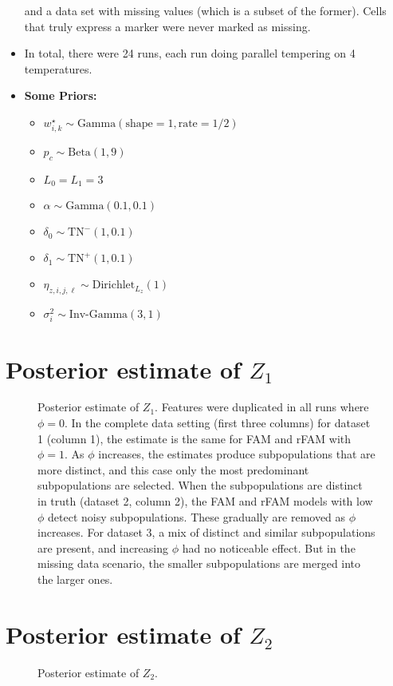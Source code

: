 \documentclass[10pt]{article} %
\newcommand{\Gam}{ \text{Gamma} }
\newcommand{\InvGamma}{ \text{Inv-Gamma} }
\def\Dir{\text{Dirichlet}}
\def\TN{\text{TN}}
\def\imscale{.16}
\begin{document}
\begin{itemize}
        and a data set with missing values (which is a subset of the former). Cells
        that truly express a marker were never marked as missing.
  \item In total, there were 24 runs, each run doing parallel tempering on 4
        temperatures.
  \item \textbf{Some Priors:}
  \begin{itemize}
    \item $w^\star_{i,k} \sim \Gam(\text{shape}=1, \text{rate}=1/2)$
    \item $p_c \sim \text{Beta}(1, 9)$
    \item $L_0=L_1=3$
    \item $\alpha \sim \Gam(0.1, 0.1)$
    \item $\delta_0 \sim \TN^-(1, 0.1)$
    \item $\delta_1 \sim \TN^+(1, 0.1)$
    \item $\eta_{z, i,j,\ell} \sim \Dir_{L_z}(1)$
    \item $\sigma^2_i \sim \InvGamma(3, 1)$
  \end{itemize}
\end{itemize}


\newpage
\section{Posterior estimate of $Z_1$}
\begin{figure}[H]
  \begin{center}  %
    \imgtemplate{Z1.pdf}{\imscale}
  \end{center}
  \caption{Posterior estimate of $Z_1$. Features were duplicated in all runs
  where $\phi=0$. In the complete data setting (first three columns) for
  dataset 1 (column 1), the estimate is the same for FAM and rFAM with
  $\phi=1$. As $\phi$ increases, the estimates produce subpopulations that
  are more distinct, and this case only the most predominant subpopulations
  are selected. When the subpopulations are distinct in truth (dataset 2,
  column 2), the FAM and rFAM models with low $\phi$ detect noisy
  subpopulations. These gradually are removed as $\phi$ increases. For dataset 3,
  a mix of distinct and similar subpopulations are present, and increasing $\phi$
  had no noticeable effect. But in the missing data scenario, the smaller subpopulations
  are merged into the larger ones.}
  \label{fig:z1est}
\end{figure}

\newpage
\section{Posterior estimate of $Z_2$}
\begin{figure}[H]
  \begin{center}  %
    \imgtemplate{Z2.pdf}{\imscale}
  \end{center}
  \caption{Posterior estimate of $Z_2$.}
  \label{fig:z2est}
\end{figure}
\end{document}
